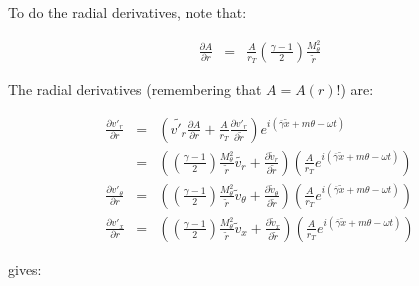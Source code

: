 To do the radial derivatives, note that:

\begin{eqnarray}
\frac{\partial A}{\partial r}
&=&
\frac{A}{r_T} 
\left(\frac{\gamma-1}{2} \right) \frac{M^2_{\theta}}{\widetilde{r}}
\nonumber
\end{eqnarray}

The radial derivatives (remembering that $A = A\left(r \right)$!) are:

\begin{eqnarray}
\frac{\partial v'_r}{\partial r}
&=&
\left(
\widetilde{v'_r}
\frac{\partial A}{\partial r}
+
\frac{A}{r_T}
\frac{\partial v'_r}{\partial \widetilde{r}} 
\right)
e^{i \left(\overline{\gamma} \widetilde{x} + m \theta - \omega t \right)}
\nonumber
\\
&=&
\left(
\left(\frac{\gamma-1}{2} \right)
\frac{M_{\theta}^2}{\widetilde{r}}
\widetilde{v_r}
+
\frac{\partial \widetilde{v}_r}{\partial \widetilde{r}} 
\right)
\left(
\frac{A}{r_T}
e^{i \left(\overline{\gamma} \widetilde{x} + m \theta - \omega t \right)}
\right)
\nonumber
\\
\frac{\partial v'_{\theta}}{\partial r}
&=&
\left(
\left(\frac{\gamma-1}{2} \right)
\frac{M_{\theta}^2}{\widetilde{r}}
\widetilde{v}_{\theta}
+
\frac{\partial \widetilde{v}_{\theta}}{\partial \widetilde{r}} 
\right)
\left(
\frac{A}{r_T}
e^{i \left(\overline{\gamma} \widetilde{x} + m \theta - \omega t \right)}
\right)
\nonumber
\\
\frac{\partial v'_x}{\partial r}
&=&
\left(
\left(\frac{\gamma-1}{2} \right)
\frac{M_{\theta}^2}{\widetilde{r}}
\widetilde{v}_x
+
\frac{\partial \widetilde{v}_x}{\partial \widetilde{r}} 
\right)
\left(
\frac{A}{r_T}
e^{i \left(\overline{\gamma} \widetilde{x} + m \theta - \omega t \right)}
\right)
\nonumber
\end{eqnarray}

gives:

